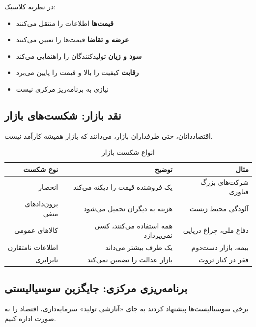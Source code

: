 \begin{defbox}
در نظریه کلاسیک:
\begin{itemize}[nosep]
    \item \textbf{قیمت‌ها} اطلاعات را منتقل می‌کنند
    \item \textbf{عرضه و تقاضا} قیمت‌ها را تعیین می‌کنند
    \item \textbf{سود و زیان} تولیدکنندگان را راهنمایی می‌کند
    \item \textbf{رقابت} کیفیت را بالا و قیمت را پایین می‌برد
    \item نیازی به برنامه‌ریز مرکزی نیست
\end{itemize}
\end{defbox}

\subsection{نقد بازار: شکست‌های بازار}

اقتصاددانان، حتی طرفداران بازار، می‌دانند که بازار همیشه کارآمد نیست.

\begin{table}[htbp]
\centering
\caption{انواع شکست بازار}
\label{tab:market-failures}
\begin{tabular}{r|r|r}
\toprule
\textbf{نوع شکست} & \textbf{توضیح} & \textbf{مثال} \\
\midrule
انحصار & یک فروشنده قیمت را دیکته می‌کند & شرکت‌های بزرگ فناوری \\
\midrule
برون‌دادهای منفی & هزینه به دیگران تحمیل می‌شود & آلودگی محیط زیست \\
\midrule
کالاهای عمومی & همه استفاده می‌کنند، کسی نمی‌پردازد & دفاع ملی، چراغ دریایی \\
\midrule
اطلاعات نامتقارن & یک طرف بیشتر می‌داند & بیمه، بازار دست‌دوم \\
\midrule
نابرابری & بازار عدالت را تضمین نمی‌کند & فقر در کنار ثروت \\
\bottomrule
\end{tabular}
\end{table}

\subsection{برنامه‌ریزی مرکزی: جایگزین سوسیالیستی}

برخی سوسیالیست‌ها پیشنهاد کردند به جای «آنارشی تولید» سرمایه‌داری، اقتصاد را به صورت  اداره کنیم.


